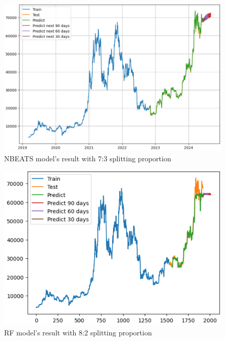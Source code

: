 \documentclass{ieeeojies}
\begin{document}
\begin{figure}[H]
	\centering
	\begin{minipage}{0.6\linewidth}
		\centering
		\includegraphics[width=\linewidth]{bibliography/Images/NBEATS_BTC_73.PNG}
		\caption{NBEATS model's result with 7:3 splitting proportion}
	\end{minipage}
\end{figure}
\begin{figure}[H]
	\centering
	\begin{minipage}{0.6\linewidth}
		\centering
		\includegraphics[width=\linewidth]{bibliography/Images/RF_BTC_82.PNG}
		\caption{RF model's result with 8:2 splitting proportion}
	\end{minipage}
\end{figure}
\end{document}
